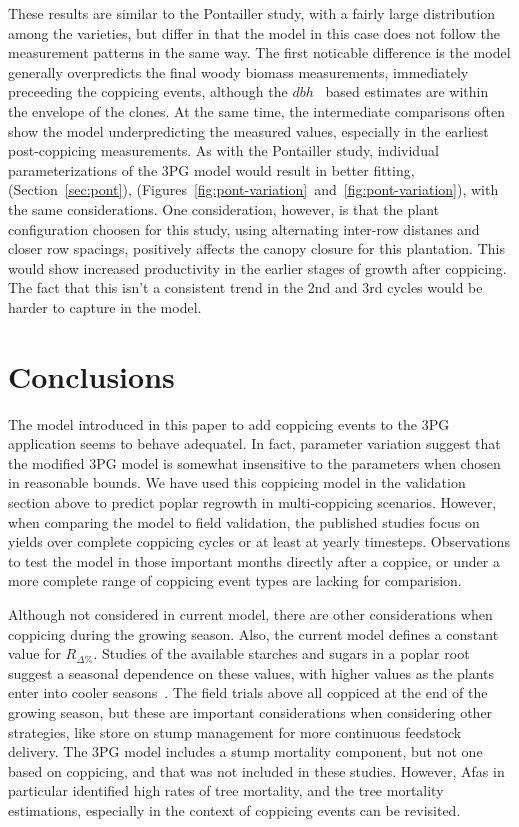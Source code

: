 \documentclass[10pt]{article}
\newcommand{\dbh}{\ensuremath{dbh}}
\newcommand{\Rdp}{\ensuremath{R_{\Delta\%}}}
\begin{document}
These results are similar to the Pontailler study, with a fairly large
distribution among the varieties, but differ in that the model in this case does
not follow the measurement patterns in the same way.  The first noticable
difference is the model generally overpredicts the final woody biomass
measurements, immediately preceeding the coppicing events, although the \dbh~
based estimates are within the envelope of the clones.  At the same time, the
intermediate comparisons often show the model underpredicting the measured
values, especially in the earliest post-coppicing measurements.  As with the
Pontailler study, individual parameterizations of the 3PG model would result in
better fitting, (Section~\ref{sec:pont}),
(Figures~\ref{fig:pont-variation}~and~\ref{fig:pont-variation}), with the same
considerations.  One consideration, however, is that the plant configuration
choosen for this study, using alternating inter-row distanes and closer row
spacings, positively affects the canopy closure for this plantation.  This would
show increased productivity in the earlier stages of growth after coppicing.
The fact that this isn't a consistent trend in the 2nd and 3rd cycles would be
harder to capture in the model.

\section*{Conclusions}

The model introduced in this paper to add coppicing events to the 3PG
application seems to behave adequatel.  In fact, parameter variation suggest
that the modified 3PG model is somewhat insensitive to the parameters when
chosen in reasonable bounds. We have used this coppicing model in the validation
section above to predict poplar regrowth in multi-coppicing scenarios.  However,
when comparing the model to field validation, the published studies focus on
yields over complete coppicing cycles or at least at yearly timesteps.
Observations to test the model in those important months directly after a
coppice, or under a more complete range of coppicing event types are lacking for
comparision.

Although not considered in current model, there are other considerations when
coppicing during the growing season.  Also, the current model defines a constant
value for \Rdp. Studies of the available starches and sugars in a poplar root
suggest a seasonal dependence on these values, with higher values as the plants
enter into cooler seasons~\cite{Regier2010}. The field trials above all coppiced
at the end of the growing season, but these are important considerations when
considering other strategies, like store on stump management for more continuous
feedstock delivery.  The 3PG model includes a stump mortality component, but not
one based on coppicing, and that was not included in these studies.  However,
Afas in particular identified high rates of tree mortality, and the tree
mortality estimations, especially in the context of coppicing events can be
revisited.
\end{document}
